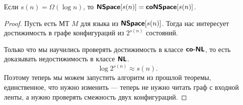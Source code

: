\begin{cor}
	Если $ s(n) = \Omega (\log n)$, то $ \textmd{\textbf{\textsf{NSpace}}}[s(n)] = \textmd{\textbf{\textsf{coNSpace}}}[s(n)]$.
\end{cor}
\begin{proof}
	Пусть есть МТ $ M$ для языка из $ \textmd{\textbf{\textsf{NSpace}}}[s(n)]$. Тогда нас интересует достижимость в графе конфигураций из $ 2^{s(n)}$ состояний.

	Только что мы научились проверять достижимость в классе $ \textmd{\textbf{\textsf{co-NL}}}$, то есть доказывать недостижимость в классе $ \textmd{\textbf{\textsf{NL}}} $.
	\[
		\log 2^{s(n)} \approx s(n)
	.\] 
	Поэтому теперь мы можем запустить алгоритм из прошлой теоремы, единственное, что нужно изменить --- теперь не нужно читать граф с входной ленты, а нужно проверять смежность двух конфигураций.
\end{proof}
